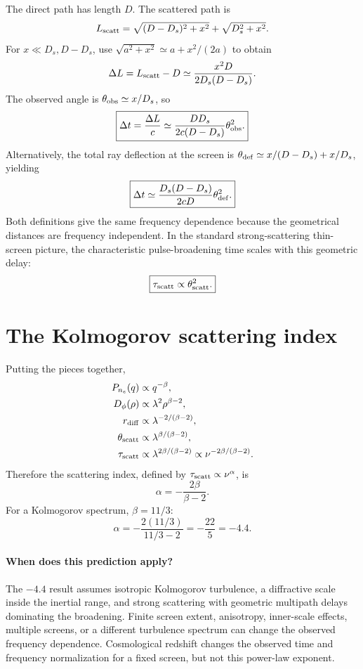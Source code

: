 The direct path has length $D$. The scattered path is
\begin{equation}
L_{\rm scatt}=\sqrt{(D-D_s)^2+x^2}+\sqrt{D_s^2+x^2}.
\end{equation}
For $x\ll D_s,D-D_s$, use $\sqrt{a^2+x^2}\simeq a+x^2/(2a)$ to obtain
\begin{equation}
\Delta L=L_{\rm scatt}-D\simeq\frac{x^2D}{2D_s(D-D_s)}.
\end{equation}
The observed angle is $\theta_{\rm obs}\simeq x/D_s$, so
\begin{equation}
\boxed{\Delta t=\frac{\Delta L}{c}\simeq
\frac{DD_s}{2c(D-D_s)}\theta_{\rm obs}^2.}
\end{equation}
Alternatively, the total ray deflection at the screen is $\theta_{\rm def}\simeq x/(D-D_s)+x/D_s$, yielding
\begin{equation}
\boxed{\Delta t\simeq\frac{D_s(D-D_s)}{2cD}\theta_{\rm def}^2.}
\end{equation}
Both definitions give the same frequency dependence because the geometrical distances are frequency independent. In the standard strong-scattering thin-screen picture, the characteristic pulse-broadening time scales with this geometric delay:
\begin{equation}
\boxed{\tau_{\rm scatt}\propto\theta_{\rm scatt}^2.}
\end{equation}

\section{The Kolmogorov scattering index}
Putting the pieces together,
\begin{align}
P_{n_e}(q)&\propto q^{-\beta},\\
D_\phi(\rho)&\propto\lambda^2\rho^{\beta-2},\\
r_{\rm diff}&\propto\lambda^{-2/(\beta-2)},\\
\theta_{\rm scatt}&\propto\lambda^{\beta/(\beta-2)},\\
\tau_{\rm scatt}&\propto\lambda^{2\beta/(\beta-2)}
\propto\nu^{-2\beta/(\beta-2)}.
\end{align}
Therefore the scattering index, defined by $\tau_{\rm scatt}\propto\nu^\alpha$, is
\begin{equation}
\boxed{\alpha=-\frac{2\beta}{\beta-2}.}
\end{equation}
For a Kolmogorov spectrum, $\beta=11/3$:
\begin{equation}
\boxed{\alpha=-\frac{2(11/3)}{11/3-2}
=-\frac{22}{5}=-4.4.}
\end{equation}

\paragraph{When does this prediction apply?}
The $-4.4$ result assumes isotropic Kolmogorov turbulence, a diffractive scale inside the inertial range, and strong scattering with geometric multipath delays dominating the broadening. Finite screen extent, anisotropy, inner-scale effects, multiple screens, or a different turbulence spectrum can change the observed frequency dependence. Cosmological redshift changes the observed time and frequency normalization for a fixed screen, but not this power-law exponent.